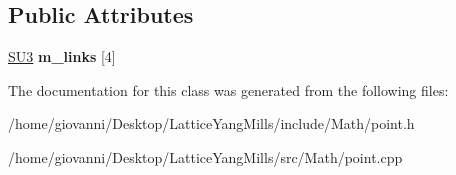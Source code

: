 \subsection*{Public Attributes}
\begin{DoxyCompactItemize}
\item 
\hyperlink{structSU3}{S\+U3} {\bfseries m\+\_\+links} \mbox{[}4\mbox{]}\hypertarget{classPoint_a9b2d9b03add6fedff7e4e9369c6871b9}{}\label{classPoint_a9b2d9b03add6fedff7e4e9369c6871b9}

\end{DoxyCompactItemize}


The documentation for this class was generated from the following files\+:\begin{DoxyCompactItemize}
\item 
/home/giovanni/\+Desktop/\+Lattice\+Yang\+Mills/include/\+Math/point.\+h\item 
/home/giovanni/\+Desktop/\+Lattice\+Yang\+Mills/src/\+Math/point.\+cpp\end{DoxyCompactItemize}
